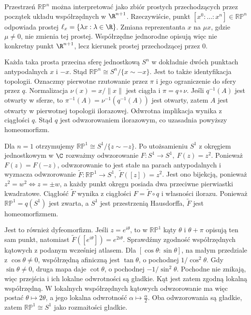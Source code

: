 \begin{uwaga}
Przestrzeń $\mathbb{RP}^n$ można interpretować jako zbiór prostych
przechodzących przez początek układu współrzędnych w $\R^{n+1}$.
Rzeczywiście, punkt $[x^0:\dots:x^n]\in\mathbb{RP}^n$
odpowiada prostej $\ell_x=\{\lambda x:\lambda\in\R\}$.
Zmiana reprezentanta $x$ na $\mu x$, gdzie $\mu\neq0$, nie zmienia tej
prostej. Współrzędne jednorodne opisują więc nie konkretny punkt
$\R^{n+1}$, lecz kierunek prostej przechodzącej przez $0$.

Każda taka prosta przecina sferę jednostkową $S^n$ w dokładnie dwóch
punktach antypodalnych $x$ i $-x$. Stąd $\mathbb{RP}^n\cong S^n/\{x\sim-x\}$.
Jest to także identyfikacja topologii. Oznaczmy pierwotne rzutowanie
przez $\pi$ i jego ograniczenie do sfery przez $q$.
Normalizacja $\nu(x)=x/\|x\|$ jest ciągła i $\pi=q\circ\nu$.
Jeśli $q^{-1}(A)$ jest otwarty w sferze, to
$\pi^{-1}(A)=\nu^{-1}(q^{-1}(A))$ jest otwarty, zatem $A$ jest
otwarty w pierwotnej topologii ilorazowej. Odwrotna implikacja
wynika z ciągłości $q$. Stąd $q$ jest odwzorowaniem ilorazowym,
co uzasadnia powyższy homeomorfizm.

Dla $n=1$ otrzymujemy $\mathbb{RP}^1\cong S^1/\{z\sim-z\}$.
Po utożsamieniu $S^1$ z okręgiem jednostkowym w $\C$ rozważmy
odwzorowanie $F:S^1\to S^1,\ F(z)=z^2$.
Ponieważ $F(z)=F(-z)$,
odwzorowanie to jest stałe na parach antypodalnych i wyznacza
odwzorowanie $\widetilde F:\mathbb{RP}^1\to S^1, \ \widetilde F([z])=z^2$.
Jest ono bijekcją, ponieważ $z^2=w^2 \iff z=\pm w$,
a każdy punkt okręgu posiada dwa przeciwne pierwiastki kwadratowe.
Ciągłość $\widetilde F$ wynika z ciągłości $F=\widetilde F\circ q$
i własności ilorazu. Ponieważ $\mathbb{RP}^1=q(S^1)$ jest zwarta,
a $S^1$ jest przestrzenią Hausdorffa, $\widetilde F$ jest homeomorfizmem.

Jest to również dyfeomorfizm. Jeśli $z=e^{i\theta}$,
to w $\mathbb{RP}^1$ kąty $\theta$ i $\theta+\pi$ opisują ten sam punkt,
natomiast $\widetilde F([e^{i\theta}])=e^{2i\theta}$.
Sprawdźmy zgodność współrzędnych kątowych z podanym wcześniej atlasem.
Dla $[\cos\theta:\sin\theta]$, na małym przedziale z $\cos\theta\ne0$,
współrzędną afiniczną jest $\tan\theta$, o pochodnej $1/\cos^2\theta$.
Gdy $\sin\theta\ne0$, druga mapa daje $\cot\theta$, o pochodnej
$-1/\sin^2\theta$. Pochodne nie znikają, więc przejścia i ich lokalne
odwrotności są gładkie. Kąt jest zatem zgodną lokalną współrzędną.
W lokalnych współrzędnych kątowych odwzorowanie ma więc postać $\theta\longmapsto 2\theta$,
a jego lokalna odwrotność $\alpha\longmapsto \frac{\alpha}{2}$.
Oba odwzorowania są gładkie, zatem $\mathbb{RP}^1\cong S^1$
jako rozmaitości gładkie.


\end{uwaga}
